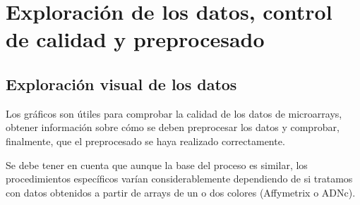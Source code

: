 \chapter{Exploraci\'on de los datos, control de calidad y preprocesado}



\section{Exploraci\'on visual de los datos}
Los gr\'aficos son \'utiles para comprobar la calidad de los datos de microarrays,
obtener informaci\'on sobre c\'omo se deben preprocesar los datos y comprobar, finalmente, que el preprocesado se haya realizado correctamente.

Se debe tener en cuenta que aunque la base del proceso es similar, los procedimientos espec\'ificos var\'ian considerablemente dependiendo de
si tratamos con datos obtenidos a partir de arrays de un o dos colores (Affymetrix o ADNc).

